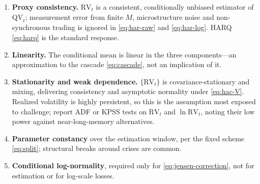 \documentclass[11pt,a4paper]{article}
\newcommand{\RV}{\mathrm{RV}}
\newcommand{\QV}{\mathrm{QV}}
\begin{document}
\begin{enumerate}
  \item \textbf{Proxy consistency.} $\RV_t$ is a consistent, conditionally unbiased estimator
        of $\QV_t$; measurement error from finite $M$, microstructure noise and
        non-synchronous trading is ignored in \eqref{eq:har-raw} and \eqref{eq:har-log}.
        HARQ \eqref{eq:harq} is the standard response.
  \item \textbf{Linearity.} The conditional mean is linear in the three components---an
        approximation to the cascade \eqref{eq:cascade}, not an implication of it.
  \item \textbf{Stationarity and weak dependence.} $\{\RV_t\}$ is covariance-stationary and
        mixing, delivering consistency and asymptotic normality under \eqref{eq:hac-V}.
        Realized volatility is highly persistent, so this is the assumption most exposed to
        challenge; report ADF or KPSS tests on $\RV_t$ and $\ln \RV_t$, noting their low
        power against near-long-memory alternatives.
  \item \textbf{Parameter constancy} over the estimation window, per the fixed scheme
        \eqref{eq:split}; structural breaks around crises are common.
  \item \textbf{Conditional log-normality}, required only for \eqref{eq:jensen-correction},
        not for estimation or for log-scale losses.
\end{enumerate}

\end{document}
